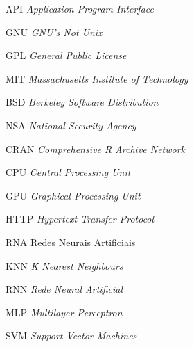 


\begin{siglas}
	
	\item[API] \textit{Application Program Interface}
	\item[GNU] \textit{GNU's Not Unix}
	\item[GPL] \textit{General Public License }
	\item[MIT] \textit{ Massachusetts Institute of Technology }
	\item[BSD] \textit{Berkeley Software Distribution}
	\item[NSA] \textit{National Security Agency}
	\item[CRAN] \textit{Comprehensive R Archive Network}
	
	\item[CPU] \textit{Central Processing Unit}
	\item[GPU] \textit{Graphical Processing Unit}
	\item[HTTP] \textit{Hypertext Transfer Protocol}
	\item[RNA] Redes Neurais Artificiais
	\item[KNN] \textit{K Nearest Neighbours}
	\item[RNN] \textit{Rede Neural Artificial}
	\item[MLP]  \textit{Multilayer Perceptron }
	\item[SVM]  \textit{Support Vector Machines }
	
	
\end{siglas}



